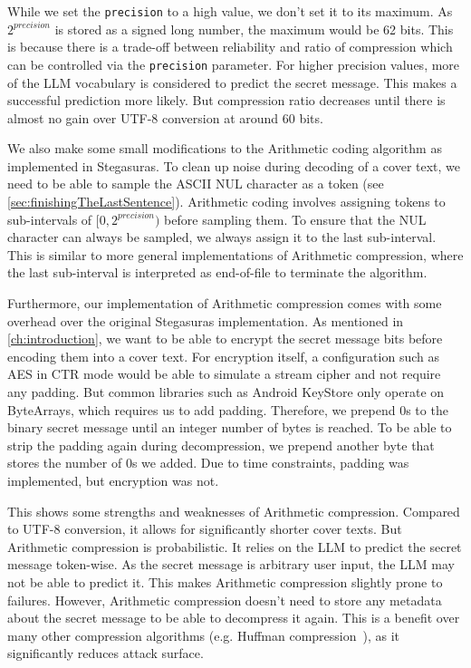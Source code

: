While we set the \lstinline|precision| to a high value, we don't set it to its maximum. As $2^{precision}$ is stored as a signed long number, the maximum would be 62 bits. This is because there is a trade-off between reliability and ratio of compression which can be controlled via the \lstinline|precision| parameter. For higher precision values, more of the \gls{LLM} vocabulary is considered to predict the secret message. This makes a successful prediction more likely. But compression ratio decreases until there is almost no gain over UTF-8 conversion at around 60 bits.

We also make some small modifications to the Arithmetic coding algorithm as implemented in Stegasuras. To clean up noise during decoding of a cover text, we need to be able to sample the ASCII NUL character as a token (see \cref{sec:finishingTheLastSentence}). Arithmetic coding involves assigning tokens to sub-intervals of $ [0, 2^{precision}) $ before sampling them. To ensure that the NUL character can always be sampled, we always assign it to the last sub-interval. This is similar to more general implementations of Arithmetic compression, where the last sub-interval is interpreted as end-of-file to terminate the algorithm.

Furthermore, our implementation of Arithmetic compression comes with some overhead over the original Stegasuras implementation. As mentioned in \cref{ch:introduction}, we want to be able to encrypt the secret message bits before encoding them into a cover text. For encryption itself, a configuration such as \gls{AES} in \gls{CTR} mode would be able to simulate a stream cipher and not require any padding. But common libraries such as Android KeyStore only operate on ByteArrays, which requires us to add padding. Therefore, we prepend 0s to the binary secret message until an integer number of bytes is reached. To be able to strip the padding again during decompression, we prepend another byte that stores the number of 0s we added. Due to time constraints, padding was implemented, but encryption was not.

This shows some strengths and weaknesses of Arithmetic compression. Compared to UTF-8 conversion, it allows for significantly shorter cover texts. But Arithmetic compression is probabilistic. It relies on the \gls{LLM} to predict the secret message token-wise. As the secret message is arbitrary user input, the \gls{LLM} may not be able to predict it. This makes Arithmetic compression slightly prone to failures. However, Arithmetic compression doesn't need to store any metadata about the secret message to be able to decompress it again. This is a benefit over many other compression algorithms (e.g. Huffman compression~\cite{huffmanMethodConstructionMinimumRedundancy1952}), as it significantly reduces attack surface.

